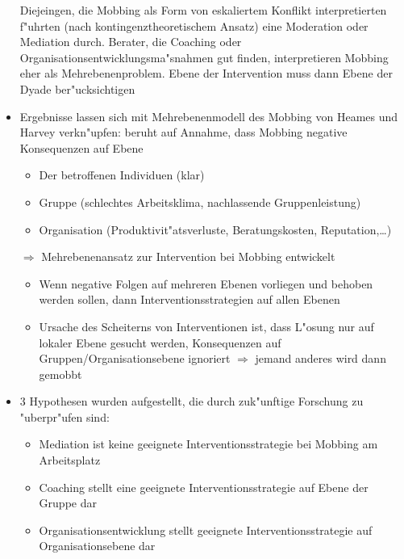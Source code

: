 \begin{itemize}
		Diejeingen, die Mobbing als Form von eskaliertem Konflikt interpretierten f"uhrten (nach kontingenztheoretischem Ansatz) eine Moderation oder Mediation durch. Berater, die Coaching oder Organisationsentwicklungsma"snahmen gut finden, interpretieren Mobbing eher als Mehrebenenproblem. Ebene der Intervention muss dann Ebene der Dyade ber"ucksichtigen
	\item
		Ergebnisse lassen sich mit Mehrebenenmodell des Mobbing von Heames und Harvey verkn"upfen: beruht auf Annahme, dass Mobbing negative Konsequenzen auf Ebene
		\begin{itemize}
			\item
				Der betroffenen Individuen (klar)
			\item
				Gruppe (schlechtes Arbeitsklima, nachlassende Gruppenleistung)
			\item
				Organisation (Produktivit"atsverluste, Beratungskosten, Reputation,\dots)
		\end{itemize}
	\item[$\Rightarrow$] Mehrebenenansatz zur Intervention bei Mobbing entwickelt
		\begin{itemize}
			\item
				Wenn negative Folgen auf mehreren  Ebenen vorliegen und behoben werden sollen, dann Interventionsstrategien auf allen Ebenen
			\item
				Ursache des Scheiterns von Interventionen ist, dass L"osung nur auf lokaler Ebene gesucht werden, Konsequenzen auf Gruppen/Organisationsebene ignoriert $\Rightarrow$ jemand anderes wird dann gemobbt
		\end{itemize}
	\item
		3 Hypothesen wurden aufgestellt, die durch zuk"unftige Forschung zu "uberpr"ufen sind:
		\begin{itemize}
			\item
				Mediation ist keine geeignete Interventionsstrategie bei Mobbing am Arbeitsplatz
			\item
				Coaching stellt eine geeignete Interventionsstrategie auf Ebene der Gruppe dar
			\item
				Organisationsentwicklung stellt geeignete Interventionsstrategie auf Organisationsebene dar
		\end{itemize}
\end{itemize}
